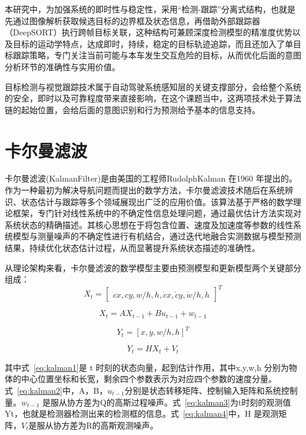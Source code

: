 本研究中，为加强系统的即时性与稳定性，采用“检测-跟踪”分离式结构，也就是先通过图像解析获取候选目标的边界框及状态信息，再借助外部跟踪器（DeepSORT）执行跨帧目标关联，这种结构可兼顾深度检测模型的精准度优势以及目标的运动学特点，达成即时，持续，稳定的目标轨迹追踪，而且还加入了单目标跟踪策略，专门关注当前可能与本车发生交互危险的目标，从而优化后面的意图分析环节的准确性与实用价值。

目标检测与视觉跟踪技术属于自动驾驶系统感知层的关键支撑部分，会给整个系统的安全，即时以及可靠程度带来直接影响，在这个课题当中，这两项技术处于算法链的起始位置，会给后面的意图识别和行为预测给予基本的信息支持。

\section{卡尔曼滤波}

卡尔曼滤波(KalmanFilter)\cite{kalman1960new}是由美国的工程师RudolphKalman 在1960 年提出的。作为一种最初为解决导航问题而提出的数学方法，卡尔曼滤波技术随后在系统辨识、状态估计与跟踪等多个领域展现出广泛的应用价值。该算法基于严格的数学理论框架，专门针对线性系统中的不确定性信息处理问题，通过最优估计方法实现对系统状态的精确描述。其核心思想在于将包含位置、速度及加速度等参数的线性系统模型与测量噪声的不确定性进行有机结合，通过迭代地融合实测数据与模型预测结果，持续优化状态估计过程，从而显著提升系统状态描述的准确性。

从理论架构来看，卡尔曼滤波的数学模型主要由预测模型和更新模型两个关键部分组成：
\begin{equation}
	X_t = \begin{bmatrix}
		cx, cy, w/h, h, \dot{c}x, \dot{c}y, \dot{w}/h, \dot{h}
	\end{bmatrix}^T
\label{eq:kalman1}
\end{equation}

\begin{equation}
	X_t = A X_{t-1} + B u_{t-1} + w_{t-1}
\label{eq:kalman2}
\end{equation}

\begin{equation}
	Y_t = [x, y, w/h, h]^T
\label{eq:kalman3}
\end{equation}

\begin{equation}
	Y_t = HX_t + V_t
\label{eq:kalman4}
\end{equation}

其中式~\eqref{eq:kalman1}是 t 时刻的状态向量，起到估计作用，其中x,y,w,h 分别为物体的中心位置坐标和长宽，剩余四个参数表示为对应四个参数的速度分量。式~\eqref{eq:kalman2}中，A，B，\(u_{t - 1}\)分别是状态转移矩阵、控制输入矩阵和系统控制量。\(w_{t - 1}\) 是服从协方差为Q的高斯过程噪声。式~\eqref{eq:kalman3}为t时刻的观测值Yt，也就是检测器检测出来的检测框的信息。式~\eqref{eq:kalman4}中，H 是观测矩阵，\(V_t\)是服从协方差为R的高斯观测噪声。

